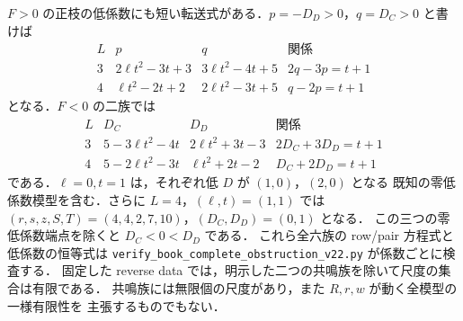 $F>0$ の正枝の低係数にも短い転送式がある．$p=-D_D>0$，$q=D_C>0$ と書けば
\[
 \begin{array}{c|c|c|c}
 L&p&q&\text{関係}\\\hline
 3&2\ell t^2-3t+3&3\ell t^2-4t+5&2q-3p=t+1\\
 4&\ell t^2-2t+2&2\ell t^2-3t+5&q-2p=t+1
 \end{array}
\]
となる．$F<0$ の二族では
\[
 \begin{array}{c|cc|c}
 L&D_C&D_D&\text{関係}\\\hline
 3&5-3\ell t^2-4t&2\ell t^2+3t-3&2D_C+3D_D=t+1\\
 4&5-2\ell t^2-3t&\ell t^2+2t-2&D_C+2D_D=t+1
 \end{array}
\]
である．$\ell=0,t=1$ は，それぞれ低 $D$ が $(1,0)$，$(2,0)$ となる
既知の零低係数模型を含む．さらに $L=4$，$(\ell,t)=(1,1)$ では
$(r,s,z,S,T)=(4,4,2,7,10)$，$(D_C,D_D)=(0,1)$ となる．
この三つの零低係数端点を除くと $D_C<0<D_D$ である．
これら全六族の row/pair 方程式と低係数の恒等式は
\nolinkurl{verify_book_complete_obstruction_v22.py} が係数ごとに検査する．
固定した reverse data では，明示した二つの共鳴族を除いて尺度の集合は有限である．
共鳴族には無限個の尺度があり，また $R,r,w$ が動く全模型の一様有限性を
主張するものでもない．
